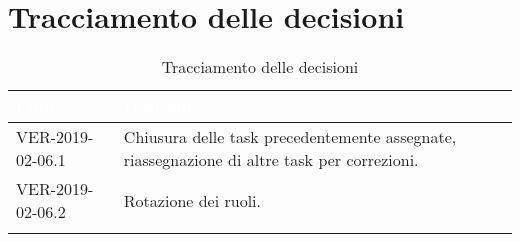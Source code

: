 
\section{Tracciamento delle decisioni}

\begin{longtable}{|C{.40\textwidth}|C{.60\textwidth}|}
\hline
{}\textbf{\textcolor{white}{Codice}} & \textbf{\textcolor{white}{Decisione}}\\
\hline
VER-2019-02-06.1 & Chiusura delle task precedentemente assegnate, riassegnazione di altre task per correzioni.\\
\hline
{}VER-2019-02-06.2 & Rotazione dei ruoli. \\
\hline
\caption{Tracciamento delle decisioni}
\end{longtable}

